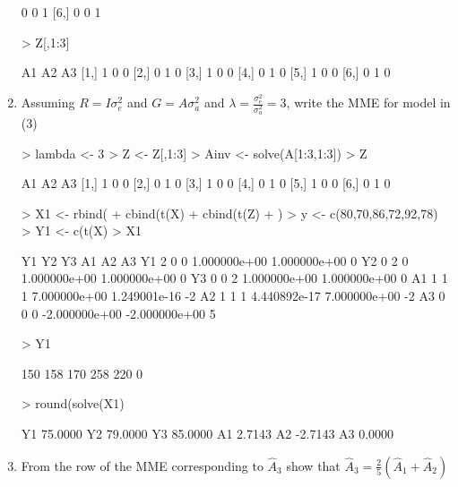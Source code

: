 \documentclass[12pt,a4paper]{paper}
\begin{document}
\begin{enumerate}
\begin{Schunk}
\begin{Soutput}
[5,]  0  0  1
[6,]  0  0  1
\end{Soutput}
\begin{Sinput}
> Z[,1:3]
\end{Sinput}
\begin{Soutput}
     A1 A2 A3
[1,]  1  0  0
[2,]  0  1  0
[3,]  1  0  0
[4,]  0  1  0
[5,]  1  0  0
[6,]  0  1  0
\end{Soutput}
\end{Schunk}
\item Assuming $R=I\sigma^{2}_{e}$ and $G = A\sigma^{2}_{a}$ and $\lambda = \frac{\sigma^{2}_{e}}{\sigma^{2}_{a}} = 3$, write the MME for model in (3)
\begin{Schunk}
\begin{Sinput}
> lambda <- 3
> Z <- Z[,1:3]
> Ainv <- solve(A[1:3,1:3])
> Z
\end{Sinput}
\begin{Soutput}
     A1 A2 A3
[1,]  1  0  0
[2,]  0  1  0
[3,]  1  0  0
[4,]  0  1  0
[5,]  1  0  0
[6,]  0  1  0
\end{Soutput}
\begin{Sinput}
> X1 <- rbind(
+   cbind(t(X) %*% X, t(X) %*% Z),
+   cbind(t(Z) %*% X, t(Z) %*% Z + Ainv*lambda)
+   )
> y <- c(80,70,86,72,92,78)
> Y1 <- c(t(X) %*% y,t(Z) %*% y)
> X1
\end{Sinput}
\begin{Soutput}
   Y1 Y2 Y3            A1            A2 A3
Y1  2  0  0  1.000000e+00  1.000000e+00  0
Y2  0  2  0  1.000000e+00  1.000000e+00  0
Y3  0  0  2  1.000000e+00  1.000000e+00  0
A1  1  1  1  7.000000e+00  1.249001e-16 -2
A2  1  1  1  4.440892e-17  7.000000e+00 -2
A3  0  0  0 -2.000000e+00 -2.000000e+00  5
\end{Soutput}
\begin{Sinput}
> Y1
\end{Sinput}
\begin{Soutput}
[1] 150 158 170 258 220   0
\end{Soutput}
\begin{Sinput}
> round(solve(X1) %*% Y1,4)
\end{Sinput}
\begin{Soutput}
      [,1]
Y1 75.0000
Y2 79.0000
Y3 85.0000
A1  2.7143
A2 -2.7143
A3  0.0000
\end{Soutput}
\end{Schunk}
\item From the row of the MME corresponding to $\hat{A}_{3}$ show that $\hat{A}_{3} = \frac{2}{5}(\hat{A}_{1} + \hat{A}_{2})$
\begin{Schunk}

\end{Schunk}
\end{enumerate}
\end{document}
